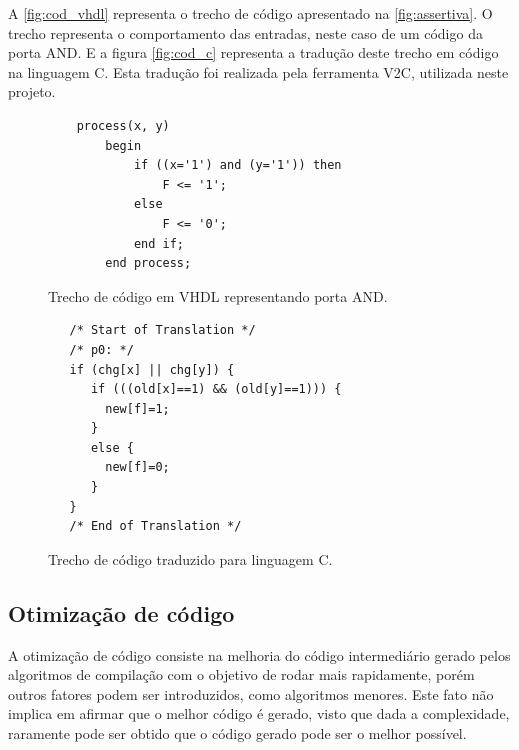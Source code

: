 \par
A \autoref{fig:cod_vhdl} representa o trecho de código apresentado na \autoref{fig:assertiva}. O trecho representa o comportamento das entradas, neste caso de um código da porta AND. E a figura \autoref{fig:cod_c} representa a tradução deste trecho em código na linguagem C. Esta tradução foi realizada pela ferramenta V2C, utilizada neste projeto.

\begin{figure}[thp]
\caption{\label{fig:cod_vhdl} Trecho de código em VHDL representando porta AND.}
	\begin{center}
    \begin{minipage}{0.9\textwidth}
    \begin{lstlisting}       
	process(x, y)
    	begin
        	if ((x='1') and (y='1')) then
            	F <= '1';
        	else
            	F <= '0';
        	end if;
    	end process;
\end{lstlisting}
    \end{minipage}
	\end{center}
\end{figure}

\begin{figure}[thp]
\caption{\label{fig:cod_c} Trecho de código traduzido para linguagem C.}
	\begin{center}
    \begin{minipage}{0.9\textwidth}
    \begin{lstlisting}       
   /* Start of Translation */
   /* p0: */
   if (chg[x] || chg[y]) {
      if (((old[x]==1) && (old[y]==1))) {
      	new[f]=1;
      }
      else {
      	new[f]=0;
      }
   }
   /* End of Translation */

	\end{lstlisting}
    \end{minipage}
	\end{center}
\end{figure}
\subsection{Otimização de código}
\par
A otimização de código consiste na melhoria do código intermediário gerado pelos algoritmos de compilação com o objetivo de rodar mais rapidamente, porém outros fatores podem ser introduzidos, como algoritmos menores. Este fato não implica em afirmar que o melhor código é gerado, visto que dada a complexidade, raramente pode ser obtido que o código gerado pode ser o melhor possível\cite{aho2007compilers}.

